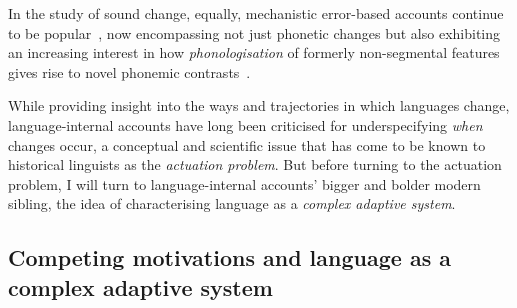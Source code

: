 In the study of sound change, equally, mechanistic error-based accounts continue to be popular~\citep[see e.g.][who make specific reference to the importance of \emph{asymmetries} between phonetic variants to explain change]{Garrett2013}, %
now encompassing not just phonetic changes but also exhibiting an increasing interest in how \emph{phonologisation} of formerly non-segmental features gives rise to novel phonemic contrasts~\citep[e.g.][]{Kirby2013}.

While providing insight into the ways and trajectories in which languages change, language-internal accounts have long been criticised for underspecifying \emph{when} changes occur, a conceptual and scientific issue that has come to be known to historical linguists as the \emph{actuation problem}. But before turning to the actuation problem, I will turn to language-internal accounts' bigger and bolder modern sibling, the idea of characterising language as a \emph{complex adaptive system}.



\subsection{Competing motivations and language as a complex adaptive system}
\label{sec:lcas}

